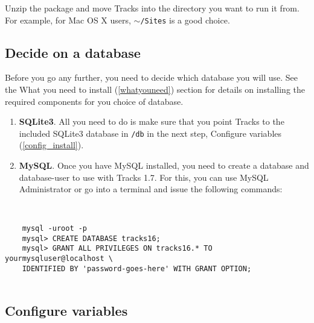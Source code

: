 \documentclass[10pt,twoside]{memoir}
\begin{document}
Unzip the package and move Tracks into the directory you want to run it from. For example, for Mac OS X users, \texttt{\ensuremath{\sim}/Sites} is a good choice.


\subsection{Decide on a database}
\label{database_install}

Before you go any further, you need to decide which database you will use. See the What you need to install (\autoref{whatyouneed}) section for details on installing the required components for you choice of database.


\begin{enumerate}


\item \textbf{SQLite3}. All you need to do is make sure that you point Tracks to the included SQLite3 database in \texttt{/db} in the next step, Configure variables (\autoref{config_install}).

\item \textbf{MySQL}. Once you have MySQL installed, you need to create a database and database-user to use with Tracks 1.7. For this, you can use MySQL Administrator or go into a terminal and issue the following commands:
\end{enumerate}

\begin{adjustwidth}{2.5em}{2.5em}
\begin{verbatim}


    mysql -uroot -p
    mysql> CREATE DATABASE tracks16;
    mysql> GRANT ALL PRIVILEGES ON tracks16.* TO yourmysqluser@localhost \
    IDENTIFIED BY 'password-goes-here' WITH GRANT OPTION;


\end{verbatim}
\end{adjustwidth}

\subsection{Configure variables}
\label{config_install}
\end{document}

